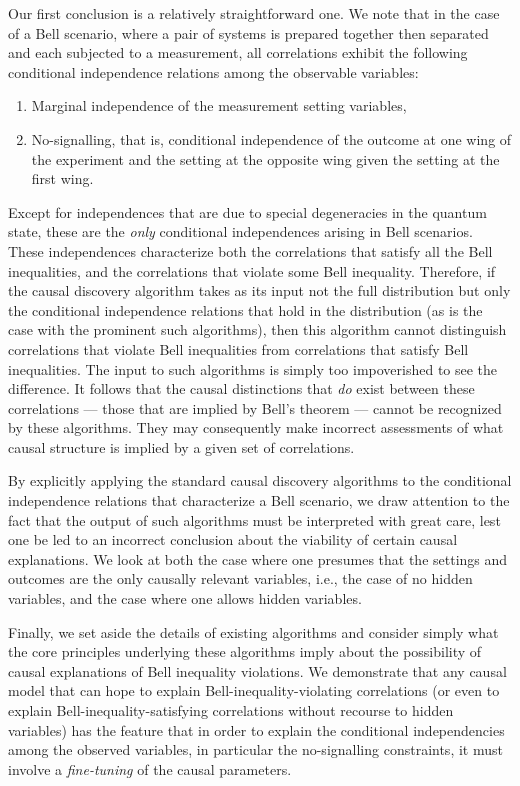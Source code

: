\documentclass[letterpaper,onecolumn,nofootinbib]{revtex4}
\begin{document}
Our first conclusion is a relatively straightforward one.  We note that in the case of  a Bell scenario, where a pair of systems is prepared together then separated and each subjected to a measurement, \color{black} all correlations exhibit the following conditional independence relations among the observable variables:
\begin{enumerate}
\item Marginal independence of the measurement setting variables,
\item No-signalling, that is, conditional independence of the outcome at one wing of the experiment and the setting at the opposite wing given the setting at the first wing.
\end{enumerate}
Except for independences that are due to special degeneracies in the quantum state,  these are the \emph{only} conditional independences arising in Bell scenarios.
These independences characterize both the correlations that satisfy all the Bell inequalities, and the correlations that violate some Bell inequality. Therefore, if the causal discovery algorithm takes as its input not the full distribution but only the conditional independence relations that hold in the distribution (as is the case with the prominent such algorithms), then this algorithm cannot distinguish
correlations that violate Bell inequalities from correlations that satisfy
Bell inequalities. The input to such algorithms is simply too impoverished
to see the difference. It follows that the causal distinctions that \emph{do}
exist between these correlations --- those that are implied by Bell's theorem --- cannot be
recognized by these algorithms.  They may consequently make incorrect
assessments of what causal structure is implied by a given set of
correlations.


By explicitly applying the standard causal discovery algorithms to the conditional independence relations that characterize a Bell scenario, we draw attention to the fact that the output of such algorithms must be interpreted with great care, lest one be led to an incorrect conclusion about the viability of certain causal explanations.  We look at both the case where one presumes that the settings and outcomes are the only causally relevant variables, i.e., the case of no hidden variables, and the case where one allows hidden variables.
 
Finally, we set aside the details of existing algorithms and consider simply what the core principles underlying these algorithms imply about the possibility of causal explanations of Bell inequality violations. 
We demonstrate that any causal model that can hope to explain Bell-inequality-violating correlations (or even to explain Bell-inequality-satisfying correlations without recourse to hidden variables) has the feature that in order to explain the conditional independencies among the observed variables, in particular the no-signalling constraints, it must involve a \emph{fine-tuning} of the causal parameters.
\end{document}
